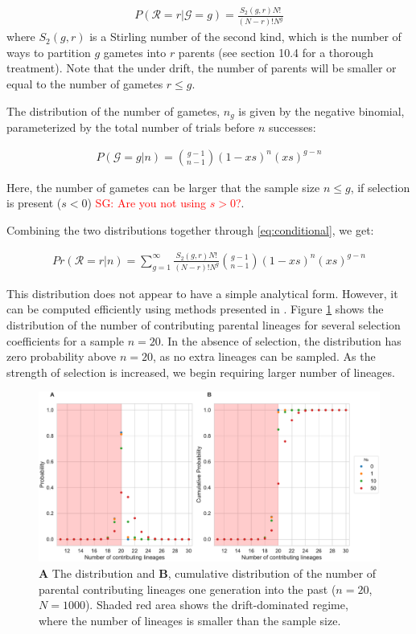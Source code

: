 \documentclass[review]{elsarticle}
\newcommand{\sgcomment}[1]{\textcolor{red}{SG: #1}}
\begin{document}
\begin{align}
  \label{eq:occupancy}
  P(\mathcal{R}=r|\mathcal{G}=g) = \frac{S_2(g,r) N!}{(N-r)! N^g}
\end{align}
where $S_2(g,r)$ is a Stirling number of the second kind, which is the number of ways to partition
$g$ gametes into $r$ parents (see \cite{JohnsonEtAl2005} section 10.4 for a thorough treatment).
Note that the under drift, the number of parents will be smaller or equal to the number of gametes
$r \le g$.

The distribution of the number of gametes, $n_g$ is given by the negative binomial, parameterized by
the total number of trials before $n$ successes:

\begin{align}
  \label{eq:neg-binomial-trials}
  P(\mathcal{G}=g|n) = \binom{g-1}{n-1}(1-xs)^n(xs)^{g-n}
\end{align}

Here, the number of gametes can be larger that the sample size $n \le g$, if selection is present
($s<0$) \sgcomment{Are you not using $s>0$?}.


Combining the two distributions together through \ref{eq:conditional}, we get:

\begin{align}
  \label{eq:lineages-in-past}
   Pr(\mathcal{R}=r|n) = \sum_{g=1}^{\infty} \frac{S_2(g,r) N!}{(N-r)! N^g} \binom{g-1}{n-1}(1-xs)^n(xs)^{g-n}
\end{align}

This distribution does not appear to have a simple analytical form. However, it can be computed
efficiently using methods presented in \citep{ONeill2019}. Figure \ref{fig:sampling-dist} shows the
distribution of the number of contributing parental lineages for several selection coefficients for
a sample $n=20$. In the absence of selection, the distribution has zero probability above $n=20$, as
no extra lineages can be sampled. As the strength of selection is increased, we begin requiring
larger number of lineages.

\begin{figure}
  \centering
  \includegraphics[]{fig/distributions.pdf}
  \caption{\textbf{A} The distribution and \textbf{B}, cumulative distribution of the number of
    parental contributing lineages one generation into the past ($n=20$, $N=1000$). Shaded red area
    shows the drift-dominated regime, where the number of lineages is smaller than the sample size.}
  \label{fig:sampling-dist}
\end{figure}
\end{document}
